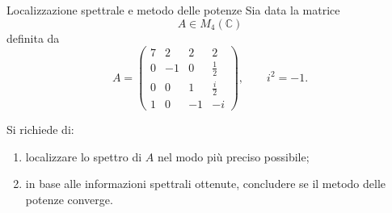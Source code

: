 \documentclass[a4paper]{article}
\begin{document}
\begin{snippetexercise}{Localizzazione spettrale e metodo delle potenze}
    Sia data la matrice
    \[
        A\in M_4(\mathbb{C})
    \]
    definita da
    \[
        A=
        \begin{pmatrix}
            7 & 2 & 2 & 2\\
            0 & -1 & 0 & \frac{1}{2}\\
            0 & 0 & 1 & \frac{i}{2}\\
            1 & 0 & -1 & -i
        \end{pmatrix},
        \qquad
        i^2=-1.
    \]

    Si richiede di:
    \begin{enumerate}
        \item localizzare lo spettro di \(A\) nel modo più preciso possibile;
        \item in base alle informazioni spettrali ottenute, concludere se il metodo delle potenze converge.
    \end{enumerate}
\end{snippetexercise}
\end{document}

